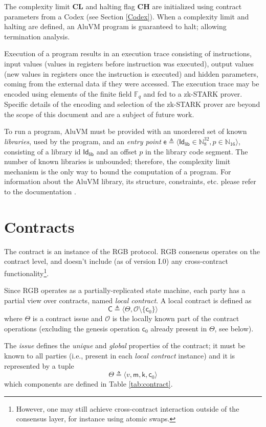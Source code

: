 \documentclass[9pt,oneside]{amsart}
\begin{document}
\begin{multicols}{2}
The complexity limit \textbf{CL} and halting flag \textbf{CH} are initialized using contract parameters
from a Codex (see Section \ref{Codex}). When a complexity limit and halting are defined, an AluVM program
is guaranteed to halt; allowing termination analysis.

Execution of a program results in an execution trace consisting of instructions,
input values (values in registers before instruction was executed),
output values (new values in registers once the instruction is executed)
and hidden parameters, coming from the external data if they were accessed.
The execution trace may be encoded using elements of the finite field $\mathbb{F}_q$
and fed to a zk-STARK prover. Specific details of the encoding and selection of the zk-STARK prover
are beyond the scope of this document and are a subject of future work.

To run a program, AluVM must be provided with an unordered set of known \emph{libraries},
used by the program, and an \emph{entry point} 
$\mathsf{e} \triangleq \langle \mathsf{Id_{lib}} \in \mathbb{N}^{32}_8, p \in \mathbb{N}_{16} \rangle$,
consisting of a library id $\mathsf{Id_{lib}}$ and an offset $p$ in the library code segment.
The number of known libraries is unbounded; therefore, the complexity limit mechanism
is the only way to bound the computation of a program.
For information about the AluVM library, its structure, constraints, etc. please refer to the
documentation \cite{AluVM}.

\section{Contracts}

The contract is an instance of the RGB protocol. RGB consensus operates on the contract level,
and doesn't include (as of version I.0) any cross-contract functionality\footnote{%
However, one may still achieve cross-contract interaction outside of the consensus layer,
for instance using atomic swaps.}.

Since RGB operates as a partially-replicated state machine,
each party has a partial view over contracts, named \emph{local contract}. 
A local contract is defined as
\noindent
\begin{equation}
\mathsf{C} \triangleq \langle \mathsf{\Theta}, \mathcal{O} \setminus \{ \mathsf{c}_0 \} \rangle
\end{equation}
\noindent
where $\Theta$ is a contract issue and
$\mathcal{O}$ is the locally known part of the contract operations
(excluding the genesis operation $\mathsf{c}_0$ already present in $\Theta$, see below).

The \emph{issue} defines the \emph{unique} and \emph{global} properties of the contract;
it must be known to all parties (i.e., present in each \emph{local contract} instance) and
it is represented by a tuple
\noindent
\begin{equation}
\mathsf{\Theta} \triangleq \langle v, \mathsf{m}, \mathsf{k}, \mathsf{c}_0 \rangle
\end{equation}
\noindent
which components are defined in Table \ref{tab:contract}.

\end{multicols}
\end{document}

